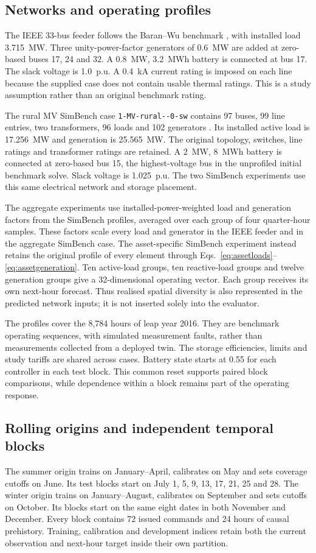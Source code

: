 \documentclass[preprint,12pt]{elsarticle}
\begin{document}
\subsection{Networks and operating profiles}
The IEEE 33-bus feeder follows the Baran--Wu benchmark \cite{baran}, with installed load 3.715~MW. Three unity-power-factor generators of 0.6~MW are added at zero-based buses 17, 24 and 32. A 0.8~MW, 3.2~MWh battery is connected at bus 17. The slack voltage is 1.0~p.u. A 0.4~kA current rating is imposed on each line because the supplied case does not contain usable thermal ratings. This is a study assumption rather than an original benchmark rating.

The rural MV SimBench case \texttt{1-MV-rural-{}-0-sw} contains 97 buses, 99 line entries, two transformers, 96 loads and 102 generators \cite{meinecke,dataset}. Its installed active load is 17.256~MW and generation is 25.565~MW. The original topology, switches, line ratings and transformer ratings are retained. A 2~MW, 8~MWh battery is connected at zero-based bus 15, the highest-voltage bus in the unprofiled initial benchmark solve. Slack voltage is 1.025~p.u. The two SimBench experiments use this same electrical network and storage placement.

The aggregate experiments use installed-power-weighted load and generation factors from the SimBench profiles, averaged over each group of four quarter-hour samples. These factors scale every load and generator in the IEEE feeder and in the aggregate SimBench case. The asset-specific SimBench experiment instead retains the original profile of every element through Eqs.~\eqref{eq:assetloads}--\eqref{eq:assetgeneration}. Ten active-load groups, ten reactive-load groups and twelve generation groups give a 32-dimensional operating vector. Each group receives its own next-hour forecast. Thus realised spatial diversity is also represented in the predicted network inputs; it is not inserted solely into the evaluator.

The profiles cover the 8,784 hours of leap year 2016. They are benchmark operating sequences, with simulated measurement faults, rather than measurements collected from a deployed twin. The storage efficiencies, limits and study tariffs are shared across cases. Battery state starts at 0.55 for each controller in each test block. This common reset supports paired block comparisons, while dependence within a block remains part of the operating response.

\subsection{Rolling origins and independent temporal blocks}
The summer origin trains on January--April, calibrates on May and sets coverage cutoffs on June. Its test blocks start on July 1, 5, 9, 13, 17, 21, 25 and 28. The winter origin trains on January--August, calibrates on September and sets cutoffs on October. Its blocks start on the same eight dates in both November and December. Every block contains 72 issued commands and 24 hours of causal prehistory. Training, calibration and development indices retain both the current observation and next-hour target inside their own partition.
\end{document}
